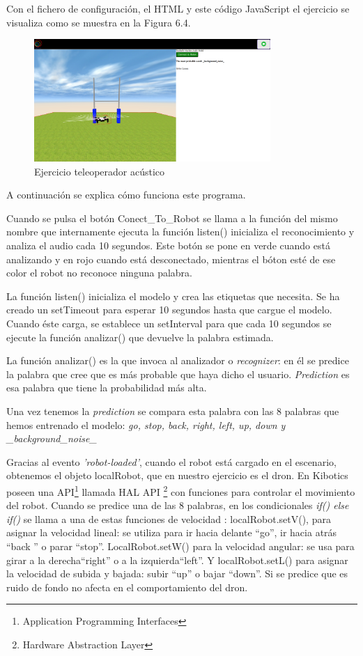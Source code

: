 Con el fichero de configuración, el HTML y este código JavaScript el ejercicio se visualiza como se muestra en la Figura 6.4.

\begin{figure}[H]
    \centering
    \includegraphics[width=0.8\textwidth, height=0.4\textwidth]{chapters/images/audio.png}
    \caption{Ejercicio teleoperador acústico}
    \label{fig:my_label}
\end{figure}

A continuación se explica cómo funciona este programa.

Cuando se pulsa el botón Conect\_To\_Robot se llama a la función del mismo nombre que internamente ejecuta  la función listen()  inicializa el reconocimiento y analiza el audio cada 10 segundos.
Este botón se pone en verde cuando está analizando y en rojo cuando está desconectado, mientras el bóton esté de ese color el robot no reconoce ninguna palabra.

La función listen() inicializa el modelo y crea las etiquetas que necesita. Se ha creado un setTimeout para esperar 10 segundos hasta que cargue el modelo. Cuando éste carga, se establece un setInterval para que cada 10 segundos se ejecute la función analizar() que devuelve la palabra estimada.

La función analizar() es la que invoca al analizador o \textit{recognizer}: en él se predice la palabra que cree que es más probable que haya dicho el usuario.  \textit{Prediction} es esa palabra que tiene  la probabilidad más alta.

Una vez tenemos la \textit{prediction} se compara esta palabra con las 8 palabras que hemos entrenado el modelo: \textit{go, stop, back, right, left, up, down y \_background\_noise\_}

Gracias al evento \textit{'robot-loaded'}, cuando el robot está cargado en el escenario, obtenemos el objeto localRobot, que en nuestro ejercicio es el dron. En Kibotics poseen una API\footnote{Application Programming Interfaces} llamada HAL API \footnote{Hardware Abstraction Layer} con funciones para controlar el movimiento del robot.  Cuando se predice una de las 8 palabras, en los condicionales \textit{if(){} else if() {}} se llama a una de estas funciones de velocidad : localRobot.setV(), para asignar la velocidad lineal: se utiliza para ir hacia delante ``go'', ir hacia atrás ``back '' o parar ``stop''.  LocalRobot.setW() para la velocidad angular: se usa para girar a la derecha``right'' o a la izquierda``left''. Y localRobot.setL() para asignar la velocidad de subida y bajada: subir ``up'' o bajar ``down''. Si se predice que es ruido de fondo no afecta en el comportamiento del dron.

